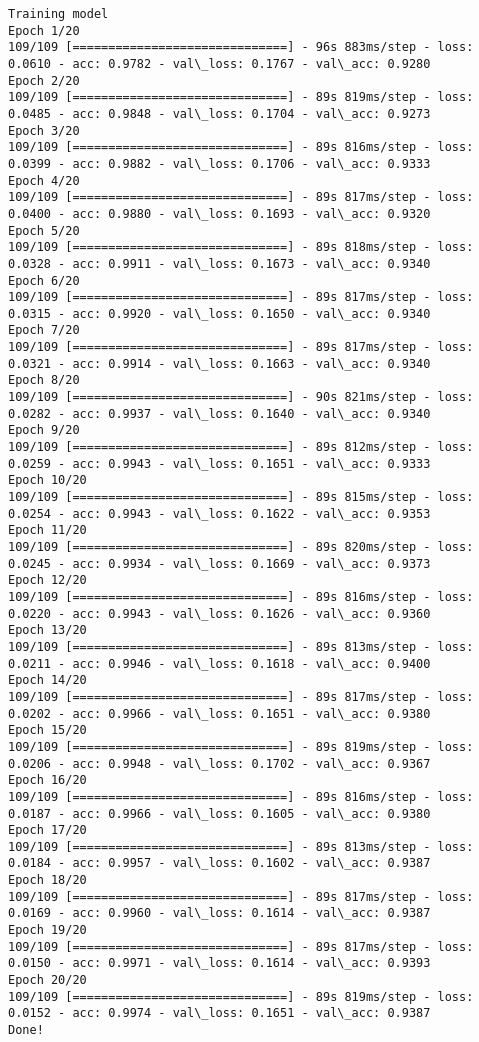 \documentclass[11pt]{article}
\begin{document}
    \begin{Verbatim}[commandchars=\\\{\}]
Training model
Epoch 1/20
109/109 [==============================] - 96s 883ms/step - loss: 0.0610 - acc: 0.9782 - val\_loss: 0.1767 - val\_acc: 0.9280
Epoch 2/20
109/109 [==============================] - 89s 819ms/step - loss: 0.0485 - acc: 0.9848 - val\_loss: 0.1704 - val\_acc: 0.9273
Epoch 3/20
109/109 [==============================] - 89s 816ms/step - loss: 0.0399 - acc: 0.9882 - val\_loss: 0.1706 - val\_acc: 0.9333
Epoch 4/20
109/109 [==============================] - 89s 817ms/step - loss: 0.0400 - acc: 0.9880 - val\_loss: 0.1693 - val\_acc: 0.9320
Epoch 5/20
109/109 [==============================] - 89s 818ms/step - loss: 0.0328 - acc: 0.9911 - val\_loss: 0.1673 - val\_acc: 0.9340
Epoch 6/20
109/109 [==============================] - 89s 817ms/step - loss: 0.0315 - acc: 0.9920 - val\_loss: 0.1650 - val\_acc: 0.9340
Epoch 7/20
109/109 [==============================] - 89s 817ms/step - loss: 0.0321 - acc: 0.9914 - val\_loss: 0.1663 - val\_acc: 0.9340
Epoch 8/20
109/109 [==============================] - 90s 821ms/step - loss: 0.0282 - acc: 0.9937 - val\_loss: 0.1640 - val\_acc: 0.9340
Epoch 9/20
109/109 [==============================] - 89s 812ms/step - loss: 0.0259 - acc: 0.9943 - val\_loss: 0.1651 - val\_acc: 0.9333
Epoch 10/20
109/109 [==============================] - 89s 815ms/step - loss: 0.0254 - acc: 0.9943 - val\_loss: 0.1622 - val\_acc: 0.9353
Epoch 11/20
109/109 [==============================] - 89s 820ms/step - loss: 0.0245 - acc: 0.9934 - val\_loss: 0.1669 - val\_acc: 0.9373
Epoch 12/20
109/109 [==============================] - 89s 816ms/step - loss: 0.0220 - acc: 0.9943 - val\_loss: 0.1626 - val\_acc: 0.9360
Epoch 13/20
109/109 [==============================] - 89s 813ms/step - loss: 0.0211 - acc: 0.9946 - val\_loss: 0.1618 - val\_acc: 0.9400
Epoch 14/20
109/109 [==============================] - 89s 817ms/step - loss: 0.0202 - acc: 0.9966 - val\_loss: 0.1651 - val\_acc: 0.9380
Epoch 15/20
109/109 [==============================] - 89s 819ms/step - loss: 0.0206 - acc: 0.9948 - val\_loss: 0.1702 - val\_acc: 0.9367
Epoch 16/20
109/109 [==============================] - 89s 816ms/step - loss: 0.0187 - acc: 0.9966 - val\_loss: 0.1605 - val\_acc: 0.9380
Epoch 17/20
109/109 [==============================] - 89s 813ms/step - loss: 0.0184 - acc: 0.9957 - val\_loss: 0.1602 - val\_acc: 0.9387
Epoch 18/20
109/109 [==============================] - 89s 817ms/step - loss: 0.0169 - acc: 0.9960 - val\_loss: 0.1614 - val\_acc: 0.9387
Epoch 19/20
109/109 [==============================] - 89s 817ms/step - loss: 0.0150 - acc: 0.9971 - val\_loss: 0.1614 - val\_acc: 0.9393
Epoch 20/20
109/109 [==============================] - 89s 819ms/step - loss: 0.0152 - acc: 0.9974 - val\_loss: 0.1651 - val\_acc: 0.9387
Done!

    \end{Verbatim}
\end{document}
